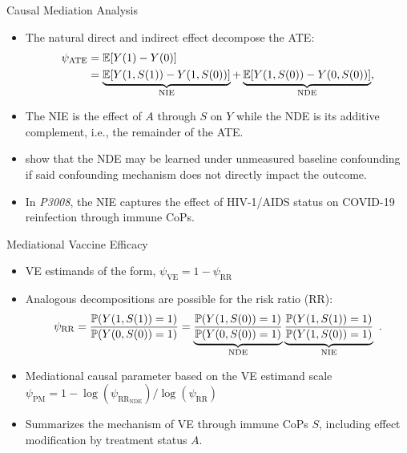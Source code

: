 \documentclass{beamer}
\begin{document}

\begin{frame}[c]{Causal Mediation Analysis}

\begin{center}
\begin{itemize}
  \itemsep8pt
  \item The natural direct and indirect effect decompose the ATE:
    \begin{align*}
      \psi_{\text{ATE}} &= \mathbb{E}[Y(1) - Y(0)] \nonumber \\
      &= \underbrace{\mathbb{E}[Y(1, S(1)) - Y(1, S(0))]}_{\text{NIE}} +
      \underbrace{\mathbb{E}[Y(1, S(0)) - Y(0, S(0))]}_{\text{NDE}},
    \end{align*}
  \item The NIE is the effect of $A$ through $S$ on $Y$ while the NDE is its
     additive complement, i.e., the remainder of the ATE.
  \item \citet{boileau2022identifying} show that the NDE may be learned under
    unmeasured baseline confounding if said confounding mechanism does not
    directly impact the outcome.
   \item In \textit{P3008}, the NIE captures the effect of HIV-1/AIDS status
       on COVID-19 reinfection through immune CoPs.
\end{itemize}
\end{center}

\note{
}

\end{frame}


\begin{frame}[c]{Mediational Vaccine Efficacy}

\begin{center}
\begin{itemize}
  \itemsep8pt
  \item VE estimands of the form, $\psi_{\text{VE}} = 1 - \psi_{\text{RR}}$
  \item Analogous decompositions are possible for the risk ratio (RR):
  \begin{equation*}
    \psi_{\text{RR}} = \frac{\mathbb{P}(Y(1, S(1)) = 1)}{\mathbb{P}(Y(0, S(0)) = 1)} =
      \underbrace{\frac{\mathbb{P}(Y(1, S(0)) = 1)}{\mathbb{P}(Y(0, S(0)) = 1)}}_{\text{NDE}}
      \underbrace{\frac{\mathbb{P}(Y(1, S(1)) = 1)}{\mathbb{P}(Y(1, S(0)) = 1)}}_{\text{NIE}} \ .
  \end{equation*}
  \item Mediational causal parameter based on the VE estimand scale
     $\psi_{\text{PM}} = 1 - \log(\psi_{\text{RR}_{\text{NDE}}})
     / \log(\psi_{\text{RR}})$
  \item Summarizes the mechanism of VE through immune CoPs $S$, including effect
  modification by treatment status $A$.
\end{itemize}
\end{center}

\note{
}

\end{frame}
\end{document}

